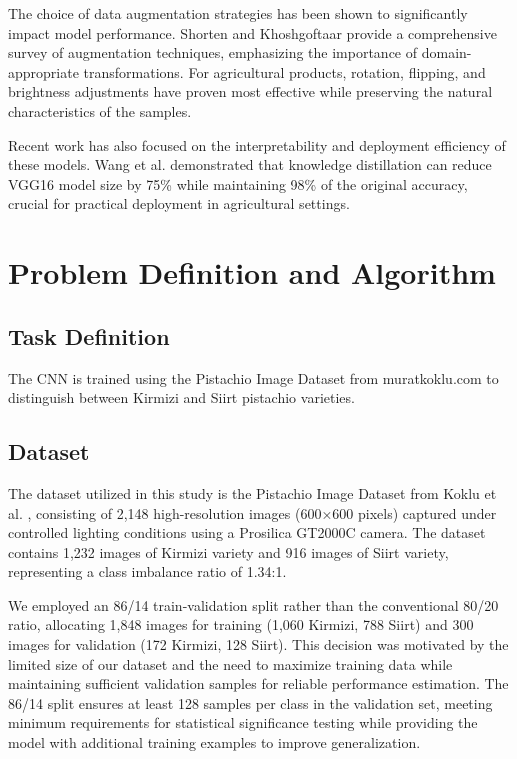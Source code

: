 \documentclass[conference]{IEEEtran}
\begin{document}
The choice of data augmentation strategies has been shown to significantly impact model performance. Shorten and Khoshgoftaar \cite{b5} provide a comprehensive survey of augmentation techniques, emphasizing the importance of domain-appropriate transformations. For agricultural products, rotation, flipping, and brightness adjustments have proven most effective while preserving the natural characteristics of the samples.

Recent work has also focused on the interpretability and deployment efficiency of these models. Wang et al. \cite{b8} demonstrated that knowledge distillation can reduce VGG16 model size by 75\% while maintaining 98\% of the original accuracy, crucial for practical deployment in agricultural settings.

\section{Problem Definition and Algorithm}
\subsection{Task Definition}
The CNN is trained using the Pistachio Image Dataset from muratkoklu.com to distinguish between Kirmizi and Siirt pistachio varieties.

\subsection{Dataset}
The dataset utilized in this study is the Pistachio Image Dataset from Koklu et al. \cite{b3}, consisting of 2,148 high-resolution images (600×600 pixels) captured under controlled lighting conditions using a Prosilica GT2000C camera. The dataset contains 1,232 images of Kirmizi variety and 916 images of Siirt variety, representing a class imbalance ratio of 1.34:1.

We employed an 86/14 train-validation split rather than the conventional 80/20 ratio, allocating 1,848 images for training (1,060 Kirmizi, 788 Siirt) and 300 images for validation (172 Kirmizi, 128 Siirt). This decision was motivated by the limited size of our dataset and the need to maximize training data while maintaining sufficient validation samples for reliable performance estimation. The 86/14 split ensures at least 128 samples per class in the validation set, meeting minimum requirements for statistical significance testing while providing the model with additional training examples to improve generalization.
\end{document}
